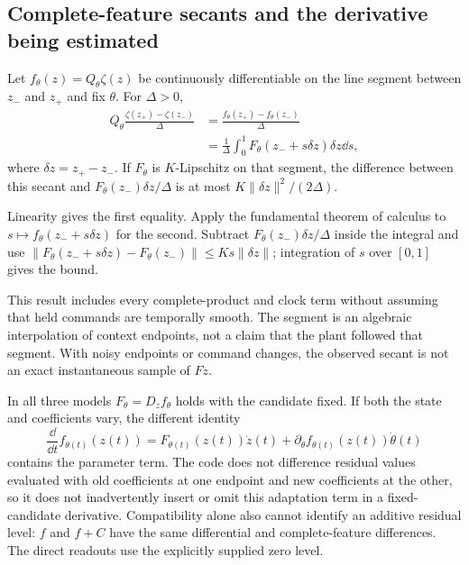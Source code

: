 \subsection{Complete-feature secants and the derivative being estimated}
\begin{auditproposition}
\label{prop:audit_secant}
Let $f_\theta(z)=Q_\theta\zeta(z)$ be continuously differentiable on the
line segment between $z_-$ and $z_+$ and fix $\theta$. For $\Delta>0$,
\begin{align}
 Q_\theta\frac{\zeta(z_+)-\zeta(z_-)}{\Delta}
 &=\frac{f_\theta(z_+)-f_\theta(z_-)}{\Delta}\\
 &=\frac{1}{\Delta}\int_0^1 F_\theta(z_-+s\delta z)\delta z\dd s,
 \label{eq:audit_secant_identity}
\end{align}
where $\delta z=z_+-z_-$. If $F_\theta$ is $K$-Lipschitz on that segment,
the difference between this secant and
$F_\theta(z_-)\delta z/\Delta$ is at most
$K\|\delta z\|^2/(2\Delta)$.
\end{auditproposition}
\begin{IEEEproof}
Linearity gives the first equality. Apply the fundamental theorem of
calculus to $s\mapsto f_\theta(z_-+s\delta z)$ for the second. Subtract
$F_\theta(z_-)\delta z/\Delta$ inside the integral and use
$\|F_\theta(z_-+s\delta z)-F_\theta(z_-)\|\le Ks\|\delta z\|$;
integration of $s$ over $[0,1]$ gives the bound.
\end{IEEEproof}
This result includes every complete-product and clock term without
assuming that held commands are temporally smooth. The segment is an
algebraic interpolation of context endpoints, not a claim that the plant
followed that segment. With noisy endpoints or command changes, the
observed secant is not an exact instantaneous sample of $F\dot z$.

In all three models $F_\theta=D_zf_\theta$ holds with the candidate fixed.
If both the state and coefficients vary, the different identity
\begin{equation}
 \frac{\dd}{\dd t}f_{\theta(t)}(z(t))
 =F_{\theta(t)}(z(t))\dot z(t)
   +\partial_\theta f_{\theta(t)}(z(t))\dot\theta(t)
 \label{eq:audit_adapting_residual}
\end{equation}
contains the parameter term. The code does not difference residual values
evaluated with old coefficients at one endpoint and new coefficients at
the other, so it does not inadvertently insert or omit this adaptation
term in a fixed-candidate derivative. Compatibility alone also cannot
identify an additive residual level: $f$ and $f+C$ have the same
differential and complete-feature differences. The direct readouts use
the explicitly supplied zero level.

